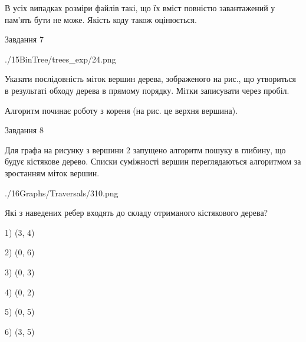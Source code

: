 \documentclass[12pt, ukrainian]{article}
\begin{document}
{В усіх випадках розміри файлів такі, що їх вміст повністю завантажений у пам'ять бути не може. Якість коду також оцінюється.



\vspace{10mm}\par

\newpage
\begin{minipage}[t]{9.7cm}
               
{\begin{center}Завдання {7}\end{center}}
\vspace{-6mm}

\begin{center}
	{./15BinTree/trees_exp/24.png}
\end{center}
Указати послідовність міток вершин дерева, зображеного на рис., що утвориться в результаті обходу дерева в прямому порядку. Мітки записувати через пробіл.\par Алгоритм починає роботу з кореня (на рис. це верхня вершина).\par

\end{minipage}
\vline \hspace{8mm}
\begin{minipage}[t]{8.0cm}
               
{\begin{center}Завдання {8}\end{center}}
\vspace{-6mm}
Для графа на рисунку з вершини 2 запущено алгоритм пошуку в глибину, що будує кістякове дерево. Списки суміжності вершин переглядаються алгоритмом за зростанням міток вершин.\par
\begin{center}
	{./16Graphs/Traversals/310.png}
\end{center}
\par Які з наведених ребер входять до складу отриманого кістякового дерева?\par
1) (3, 4)\par
2) (0, 6)\par
3) (0, 3)\par
4) (0, 2)\par
5) (0, 5)\par
6) (3, 5)\par
{\vskip 15pt} \par


\end{minipage}}
\end{document}
